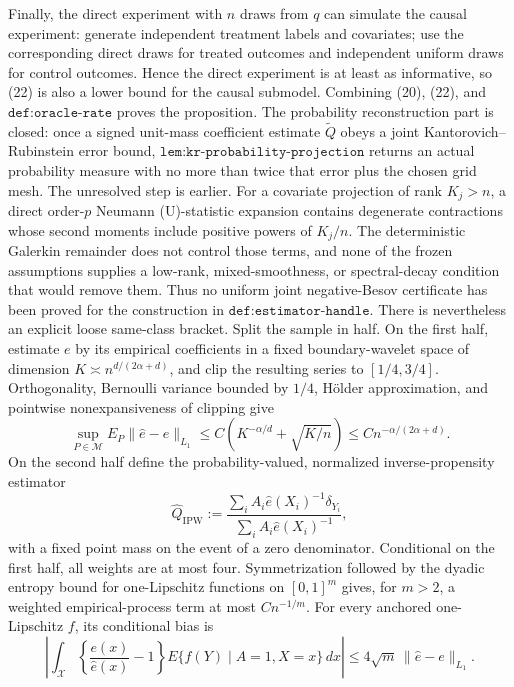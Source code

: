Finally, the direct experiment with \(n\) draws from \(q\) can simulate the causal experiment: generate independent treatment labels and covariates; use the corresponding direct draws for treated outcomes and independent uniform draws for control outcomes.  Hence the direct experiment is at least as informative, so (22) is also a lower bound for the causal submodel.  Combining (20), (22), and \(\texttt{def:oracle-rate}\) proves the proposition.
The probability reconstruction part is closed: once a signed unit-mass coefficient estimate \(\widetilde Q\) obeys a joint Kantorovich--Rubinstein error bound, \(\texttt{lem:kr-probability-projection}\) returns an actual probability measure with no more than twice that error plus the chosen grid mesh.  The unresolved step is earlier.  For a covariate projection of rank \(K_j>n\), a direct order-\(p\) Neumann (U)-statistic expansion contains degenerate contractions whose second moments include positive powers of \(K_j/n\).  The deterministic Galerkin remainder does not control those terms, and none of the frozen assumptions supplies a low-rank, mixed-smoothness, or spectral-decay condition that would remove them.  Thus no uniform joint negative-Besov certificate has been proved for the construction in \(\texttt{def:estimator-handle}\).
There is nevertheless an explicit loose same-class bracket.  Split the sample in half.  On the first half, estimate \(e\) by its empirical coefficients in a fixed boundary-wavelet space of dimension \(K\asymp n^{d/(2\alpha+d)}\), and clip the resulting series to \([1/4,3/4]\).  Orthogonality, Bernoulli variance bounded by \(1/4\), Hölder approximation, and pointwise nonexpansiveness of clipping give
\[
 \sup_{P\in\mathcal M}E_P\lVert\widehat e-e\rVert_{L_1}
 \leq C\left(K^{-\alpha/d}+\sqrt{K/n}\right)
 \leq Cn^{-\alpha/(2\alpha+d)}.
 \tag{23}
\]
On the second half define the probability-valued, normalized inverse-propensity estimator
\[
 \widehat Q_{\mathrm{IPW}}
 :=\frac{\sum_i A_i\widehat e(X_i)^{-1}\delta_{Y_i}}
          {\sum_i A_i\widehat e(X_i)^{-1}},
\]
with a fixed point mass on the event of a zero denominator.  Conditional on the first half, all weights are at most four.  Symmetrization followed by the dyadic entropy bound for one-Lipschitz functions on \([0,1]^m\) gives, for \(m>2\), a weighted empirical-process term at most \(Cn^{-1/m}\).  For every anchored one-Lipschitz \(f\), its conditional bias is
\[
 \left|\int_{\mathcal X}\left\{\frac{e(x)}{\widehat e(x)}-1\right\}
       E\{f(Y)\mid A=1,X=x\}\,dx\right|
 \leq4\sqrt m\,\lVert\widehat e-e\rVert_{L_1}.
\]
